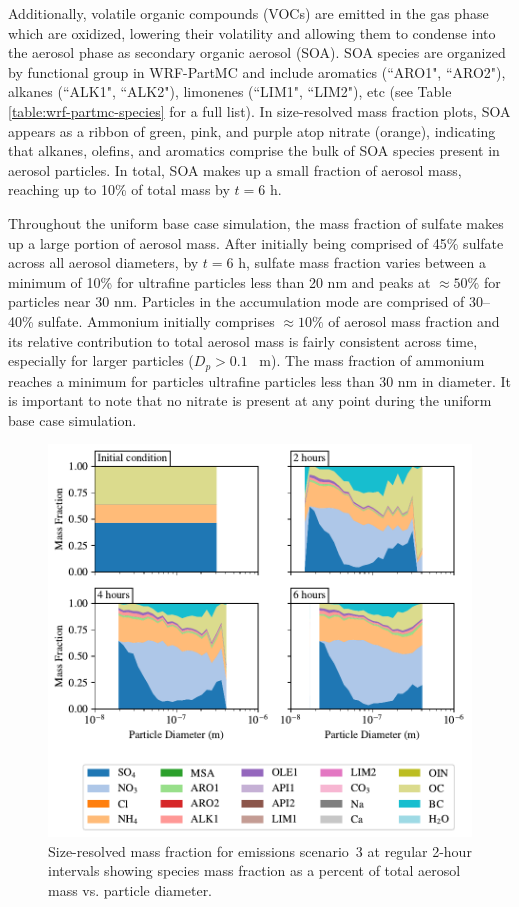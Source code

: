 Additionally, volatile organic compounds (VOCs) are emitted in the gas phase which are oxidized, lowering their volatility and allowing them to condense into the aerosol phase as secondary organic aerosol (SOA). SOA species are organized by functional group in WRF-PartMC and include aromatics (``ARO1", ``ARO2"), alkanes (``ALK1", ``ALK2"), limonenes (``LIM1", ``LIM2"), etc (see Table \ref{table:wrf-partmc-species} for a full list). In size-resolved mass fraction plots, SOA appears as a ribbon of green, pink, and purple atop nitrate (orange), indicating that alkanes, olefins, and aromatics comprise the bulk of SOA species present in aerosol particles. In total, SOA makes up a small fraction of aerosol mass, reaching up to 10\% of total mass by $t=6$ h.

Throughout the uniform base case simulation, the mass fraction of sulfate makes up a large portion of aerosol mass. After initially being comprised of 45\% sulfate across all aerosol diameters, by $t=6$ h, sulfate mass fraction varies between a minimum of 10\% for ultrafine particles less than 20 nm and peaks at $\approx50\%$ for particles near 30 nm. Particles in the accumulation mode are comprised of 30--40\% sulfate. Ammonium initially comprises $\approx10\%$ of aerosol mass fraction and its relative contribution to total aerosol mass is fairly consistent across time, especially for larger particles ($D_p > 0.1$ \si{\mu m}). The mass fraction of ammonium reaches a minimum for particles ultrafine particles less than 30 nm in diameter. It is important to note that no nitrate is present at any point during the uniform base case simulation.

\begin{figure}[!t]
  \centering
    \includegraphics[width=\textwidth]{figures/chapter5/speciated-mass-frac-four-panel-point-source-1x1-z40.pdf}
    \caption{Size-resolved mass fraction for emissions scenario~3 at regular 2-hour intervals showing species mass fraction as a percent of total aerosol mass vs. particle diameter.}
    \label{fig:mass-frac-s3}
\end{figure}

